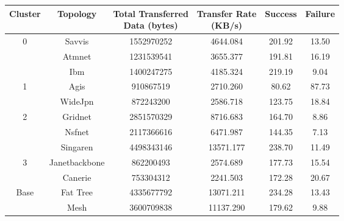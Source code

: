 \begin{tabular}{cccccc}
\toprule
Cluster & Topology & \makecell{Total Transferred\\Data (bytes)} & \makecell{Transfer Rate\\(KB/s)} & Success & Failure \\
\midrule
\multirow{3}{*}{0} & Savvis & \num{1552970252} & 4644.084 & 201.92 & 13.50 \\
& Atmnet & \num{1231539541} & 3655.377 & 191.81 & 16.19 \\
& Ibm & \num{1400247275} & 4185.324 & 219.19 & 9.04 \\ \hline
\multirow{2}{*}{1}& Agis & \num{910867519} & 2710.260 & 80.62 & 87.73 \\
& WideJpn & \num{872243200} & 2586.718 & 123.75 & 18.84 \\ \hline
\multirow{3}{*}{2} & Gridnet & \num{2851570329} & 8716.683 & 164.70 & 8.86 \\
& Nsfnet & \num{2117366616} & 6471.987 & 144.35 & 7.13 \\
& Singaren & \num{4498343146} & 13571.177 & 238.70 & 11.49 \\ \hline
\multirow{2}{*}{3}& Janetbackbone & \num{862200493} & 2574.689 & 177.73 & 15.54 \\
& Canerie & \num{753304312} & 2241.503 & 172.28 & 20.67 \\ \hline
\multirow{2}{*}{Base}& Fat Tree & \num{4335677792} & 13071.211 & 234.28 & 13.43 \\
& Mesh & \num{3600709838} & 11137.290 & 179.62 & 9.88 \\
\bottomrule
\end{tabular}
